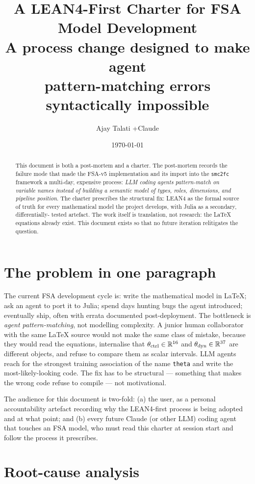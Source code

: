 \documentclass[11pt,a4paper]{article}
\title{A LEAN4-First Charter for FSA Model Development\\
  \large A process change designed to make agent\\
  pattern-matching errors syntactically impossible}
\author{Ajay Talati \quad+\quad Claude}
\date{\today}
\begin{document}
\maketitle

\begin{abstract}
This document is both a post-mortem and a charter. The post-mortem
records the failure mode that made the FSA-v5 implementation and its
import into the \texttt{smc2fc} framework a multi-day, expensive
process: \emph{LLM coding agents pattern-match on variable names
instead of building a semantic model of types, roles, dimensions,
and pipeline position}. The charter prescribes the structural fix:
LEAN4 as the formal source of truth for every mathematical model
the project develops, with Julia as a secondary, differentially-
tested artefact. The work itself is translation, not research: the
LaTeX equations already exist. This document exists so that no
future iteration relitigates the question.
\end{abstract}

\section{The problem in one paragraph}

The current FSA development cycle is: write the mathematical model
in LaTeX; ask an agent to port it to Julia; spend days hunting bugs
the agent introduced; eventually ship, often with errata documented
post-deployment. The bottleneck is \emph{agent pattern-matching}, not
modelling complexity. A junior human collaborator with the same LaTeX
source would not make the same class of mistake, because they would
read the equations, internalise that $\theta_{\rm ctrl} \in
\mathbb{R}^{16}$ and $\theta_{\rm dyn} \in \mathbb{R}^{37}$ are
different objects, and refuse to compare them as scalar intervals.
LLM agents reach for the strongest training association of the name
\texttt{theta} and write the most-likely-looking code. The fix has
to be structural --- something that makes the wrong code refuse to
compile --- not motivational.

The audience for this document is two-fold: (a) the user, as a
personal accountability artefact recording why the LEAN4-first
process is being adopted and at what point; and (b) every future
Claude (or other LLM) coding agent that touches an FSA model, who
must read this charter at session start and follow the process it
prescribes.

\section{Root-cause analysis}
\label{sec:rca}
\end{document}
